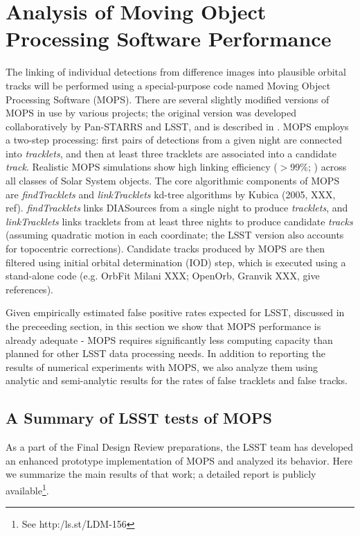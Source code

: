 
\section{Analysis of Moving Object Processing Software Performance \label{sec:mops}}


The linking of individual detections from difference images into plausible orbital tracks will be performed using 
a special-purpose code named Moving Object Processing Software (MOPS). There are several slightly modified 
versions of MOPS in use by various projects; the original version was developed collaboratively by Pan-STARRS 
and LSST, and is described in \cite{denneau13}. MOPS employs a two-step processing: first pairs of detections 
from a given night are connected into {\it tracklets}, and then at least three tracklets are associated into a 
candidate {\it track}. Realistic MOPS simulations show high linking efficiency ($>$99\%; \citealt{denneau13}) 
across all classes of Solar System objects. The core algorithmic components of MOPS are {\it findTracklets} and 
{\it linkTracklets} kd-tree algorithms by Kubica (2005, XXX, ref). {\it findTracklets} links DIASources from a single 
night to produce {\it tracklets}, and {\it linkTracklets} links tracklets from at least three nights to produce candidate 
{\it tracks} (assuming quadratic motion in each coordinate; the LSST version also accounts for topocentric 
corrections). Candidate tracks produced by MOPS are then filtered using initial orbital determination (IOD) step, 
which is executed using a stand-alone code (e.g. OrbFit Milani XXX; OpenOrb, Granvik XXX, give references). 

Given empirically estimated false positive rates expected for LSST, discussed in the preceeding section, 
in this section we show that MOPS performance is already adequate - MOPS requires significantly less 
computing capacity than planned for other LSST data processing needs. In addition to reporting the results of
numerical experiments with MOPS, we also analyze them using analytic and semi-analytic results for the
rates of false tracklets and false tracks. 




\subsection{A Summary of LSST tests of MOPS} 

As a part of the Final Design Review preparations, the LSST team has developed an enhanced prototype 
implementation of MOPS and analyzed its behavior. Here we summarize the main results of that work;
a detailed report is publicly available\footnote{See http:/ls.st/LDM-156}. 

